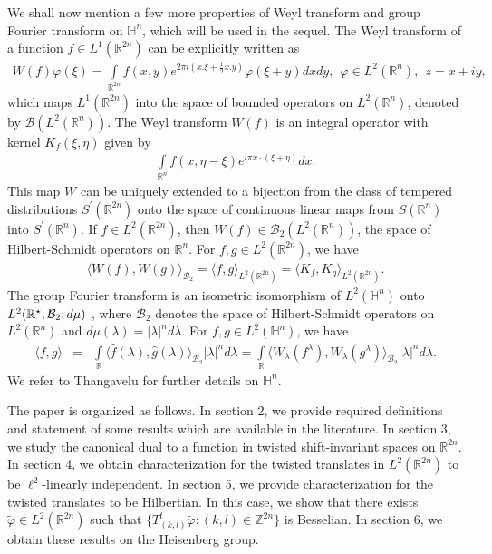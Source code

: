 \documentclass[a4paper,12pt,reqno]{amsart}
\theoremstyle{plain}
\numberwithin{equation}{section}
\theoremstyle{definition}
\begin{document}
We shall now mention a few more properties of Weyl transform and group Fourier transform on $\mathbb{H}^{n}$, which will be used in the sequel. The Weyl transform of  a function $f\in L^1(\mathbb{R}^{2n})$ can be explicitly written as
\begin{eqnarray*}
W(f)\varphi (\xi)=\int\limits_{\mathbb{R}^{2n}}  f(x,y)e^{2\pi i(x.\xi+\frac{1}{2}x.y)}\varphi(\xi+y)dxdy,~~ \varphi\in L^{2}(\mathbb {R}^{n}),~~ z=x+iy,
\end{eqnarray*}
which maps $L^{1}(\mathbb {R}^{2n})$ into the space of bounded operators on  $L^{2}(\mathbb {R}^{n})$, denoted by $\mathcal{B}(L^{2}(\mathbb {R}^{n}))$. The Weyl transform $W(f)$ is an integral operator with kernel $K_{f}(\xi,\eta)$ given by
\begin{eqnarray*}
\int\limits_{\mathbb{R}^{n}}f(x,\eta-\xi)e^{i\pi x\cdot(\xi+\eta)}dx.
\end{eqnarray*}
This map $W$ can be uniquely extended to a bijection from the class of tempered distributions $S^{\prime}(\mathbb {R}^{2n})$ onto the space of continuous linear maps from $S(\mathbb {R}^{n})$ into  $S^{\prime}(\mathbb {R}^{n})$. If $f\in L^{2}(\mathbb {R}^{2n})$, then $W(f)\in\mathcal{B}_{2}(L^{2}(\mathbb {R}^{n}))$, the space of Hilbert-Schmidt operators on $\mathbb{R}^{n}$.
For $f,g\in L^{2}(\mathbb {R}^{2n})$, we have
\begin{eqnarray}\label{3peq21}
\langle W(f), W(g)\rangle_{\mathcal{B}_{2}}=\langle f,g\rangle_{L^{2}(\mathbb {R}^{2n})}=\langle K_{f},K_{g}\rangle_{L^{2}(\mathbb {R}^{2n})}.
\end{eqnarray}
The group Fourier transform is an isometric isomorphism of $L^{2}(\mathbb{H}^{n})$ onto $L^{2}(\mathbb{R}^{\star},\mathcal{B}_{2};\\d\mu)$ , where $\mathcal{B}_{2}$ denotes the space of Hilbert-Schmidt operators on $L^{2}(\mathbb{R}^{n})$ and $d\mu(\lambda)=|\lambda|^{n}d\lambda$. For $f,g\in L^{2}(\mathbb{H}^{n})$, we have
\begin{eqnarray}\label{3peq20}
\langle f, g\rangle&=& \int\limits_{\mathbb{R}}\langle \widehat{f}(\lambda),\widehat{g}(\lambda)\rangle_{\mathcal{B}_{2}} |\lambda|^{n}d\lambda
=\int\limits_{\mathbb{R}} \langle W_{\lambda}(f^{\lambda}), W_{\lambda}(g^{\lambda})\rangle_{\mathcal{B}_{2}} |\lambda|^{n}d\lambda.
\end{eqnarray}
We refer to Thangavelu \cite{th} for further details on $\mathbb{H}^{n}$.

The paper is organized as follows. In section 2, we provide required definitions and statement of some results which are available in the literature. In section 3, we study the canonical dual to a function in twisted shift-invariant spaces on $\mathbb{R}^{2n}$. In section 4, we obtain characterization for the twisted translates in $L^{2}(\mathbb{R}^{2n})$ to be $\ell^{2}$-linearly independent. In section 5, we provide characterization for the twisted translates to be Hilbertian. In this case, we show that there exists $\tilde{\varphi}\in L^{2}(\mathbb{R}^{2n})$ such that $\{T_{(k,l)}^{t}\tilde{\varphi}:(k,l)\in\mathbb{Z}^{2n}\}$ is Besselian. In section 6, we obtain these results on the Heisenberg group.
\end{document}
